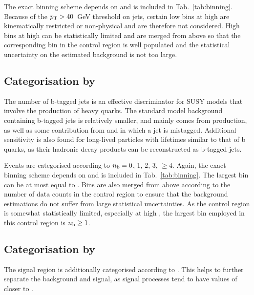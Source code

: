 The exact \scalht binning scheme depends on \njet and is included in 
Tab.~\ref{tab:binning}. Because of the ${p_{\text T}}>40$~GeV threshold on jets, certain 
low \scalht bins at high \njet are kinematically restricted or non-physical and 
are therefore 
not considered. High \scalht bins at high \njet can be statistically limited 
and are merged from above so that the corresponding bin in the control region 
is well populated and the statistical uncertainty on the estimated background  
is not too large.

\subsection*{Categorisation by \nb}

The number of b-tagged jets is an effective discriminator for SUSY %
models that involve the production of heavy quarks. The standard model 
background containing b-tagged jets is relatively smaller, and mainly comes 
from \ttbar production, as well as some contribution from \wj and \zj in which 
a jet is mistagged. Additional sensitivity is also found for long-lived 
particles with lifetimes similar to that of b quarks, as their hadronic decay 
products can be reconstructed as b-tagged jets.

Events are categorised according to $n_{\text{b}} = 0$, 1, 2, 3, $\geq4$.
Again, the exact binning scheme depends on \njet and is included in 
Tab.~\ref{tab:binning}.
The largest \nb bin can be at most equal to \njet. Bins are also merged from 
above according to the number of data counts in the \mj control region to 
ensure that the background estimations do not suffer from large statistical 
uncertainties.
As the \mmj control region is somewhat statistically limited, especially at 
high \nb, the largest \nb bin employed in this control region is $n_{\text{b}} \geq 1$.

\subsection*{Categorisation by \mht}

The signal region is additionally categorised according to \mht. This helps to 
further separate the background and signal, as signal processes 
tend to have values of \mht closer to \scalht.

